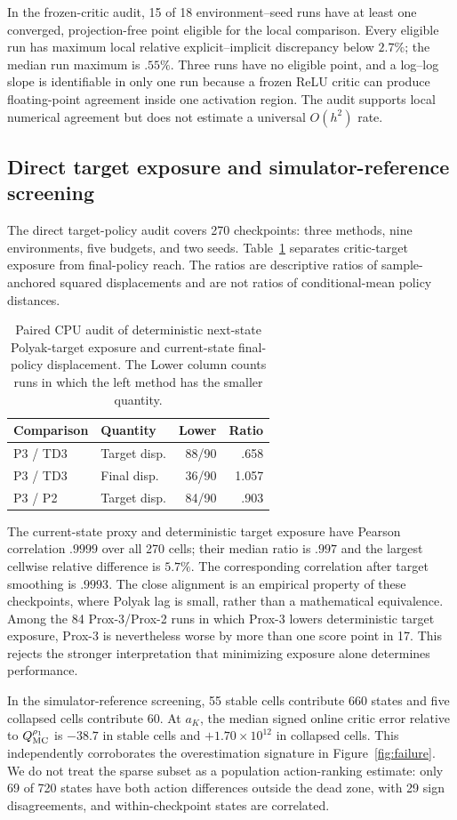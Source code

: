 \documentclass[letterpaper]{article}
\begin{document}
In the frozen-critic audit, 15 of 18 environment--seed runs have at least one converged, projection-free point eligible for the local comparison. Every eligible run has maximum local relative explicit--implicit discrepancy below $2.7\%$; the median run maximum is $.55\%$. Three runs have no eligible point, and a log--log slope is identifiable in only one run because a frozen ReLU critic can produce floating-point agreement inside one activation region. The audit supports local numerical agreement but does not estimate a universal $O(h^2)$ rate.

\subsection{Direct target exposure and simulator-reference screening}

The direct target-policy audit covers 270 checkpoints: three methods, nine
environments, five budgets, and two seeds. Table~\ref{tab:direct_exposure}
separates critic-target exposure from final-policy reach. The ratios are
descriptive ratios of sample-anchored squared displacements and are not ratios
of conditional-mean policy distances.

\begin{table}[t]
\centering
\small
\begin{tabular}{@{}llrr@{}}
\toprule
Comparison & Quantity & Lower & Ratio\\
\midrule
P3 / TD3 & Target disp. & 88/90 & .658\\
P3 / TD3 & Final disp. & 36/90 & 1.057\\
P3 / P2 & Target disp. & 84/90 & .903\\
\bottomrule
\end{tabular}
\caption{Paired CPU audit of deterministic next-state Polyak-target exposure
and current-state final-policy displacement. The Lower column counts runs in
which the left method has the smaller quantity.}
\label{tab:direct_exposure}
\end{table}

The current-state proxy and deterministic target exposure have Pearson
correlation $.9999$ over all 270 cells; their median ratio is $.997$ and the
largest cellwise relative difference is $5.7\%$. The corresponding
correlation after target smoothing is $.9993$. The close alignment is an
empirical property of these checkpoints, where Polyak lag is small, rather
than a mathematical equivalence. Among the 84 Prox-3/Prox-2 runs in which
Prox-3 lowers deterministic target exposure, Prox-3 is nevertheless worse by
more than one score point in 17. This rejects the stronger interpretation
that minimizing exposure alone determines performance.

In the simulator-reference screening, 55 stable cells contribute 660 states
and five collapsed cells contribute 60. At $a_K$, the median signed online
critic error relative to $Q_{\rm MC}^{\rho_1}$ is $-38.7$ in stable cells and
$+1.70\times10^{12}$ in collapsed cells. This independently corroborates
the overestimation signature in Figure~\ref{fig:failure}. We do not treat the sparse subset as a population action-ranking estimate: only 69 of 720 states have both
action differences outside the dead zone, with 29 sign disagreements, and
within-checkpoint states are correlated.
\end{document}
